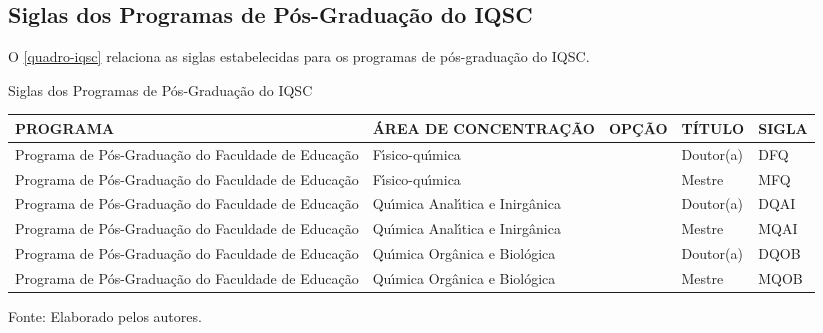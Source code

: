 \begin{apendicesenv}
\chapter{Siglas dos Programas de P\'os-Gradua\c{c}\~ao do IQSC}
O \autoref{quadro-iqsc} relaciona as siglas estabelecidas para os programas de p\'os-gradua\c{c}\~ao do IQSC.
\begin{quadro}[Htb]
\ABNTEXfontereduzida
\caption[Siglas dos Programas de P\'os-Gradua\c{c}\~ao do IQSC]{Siglas dos Programas de P\'os-Gradua\c{c}\~ao do IQSC}
\label{quadro-iqsc}
\begin{tabular}{|p{3.5cm}|p{3.5cm}|p{3.5cm}|p{1.5cm}|p{2.25cm}|}
  \hline
   \textbf{PROGRAMA} & \textbf{\'AREA DE CONCENTRA\c{C}\~AO} & \textbf{OP\c{C}\~AO} & \textbf{T\'ITULO} & \textbf{SIGLA}  \\
    \hline
Programa de P\'os-Gradua\c{c}\~ao do Faculdade de Educa\c{c}\~ao& F\'{\i}sico-qu\'{\i}mica &  & Doutor(a) & DFQ\\
Programa de P\'os-Gradua\c{c}\~ao do Faculdade de Educa\c{c}\~ao& F\'{\i}sico-qu\'{\i}mica &  & Mestre & MFQ\\
Programa de P\'os-Gradua\c{c}\~ao do Faculdade de Educa\c{c}\~ao& Qu\'{\i}mica Anal\'{\i}tica e Inirg\^anica &  & Doutor(a) & DQAI\\
Programa de P\'os-Gradua\c{c}\~ao do Faculdade de Educa\c{c}\~ao& Qu\'{\i}mica Anal\'{\i}tica e Inirg\^anica &  & Mestre & MQAI\\
Programa de P\'os-Gradua\c{c}\~ao do Faculdade de Educa\c{c}\~ao& Qu\'{\i}mica Org\^anica e Biol\'ogica &  & Doutor(a) & DQOB\\
Programa de P\'os-Gradua\c{c}\~ao do Faculdade de Educa\c{c}\~ao& Qu\'{\i}mica Org\^anica e Biol\'ogica &  & Mestre & MQOB\\
\hline

\end{tabular}
\begin{flushleft}
		Fonte: Elaborado pelos autores.\
\end{flushleft}
\end{quadro}


\end{apendicesenv}

